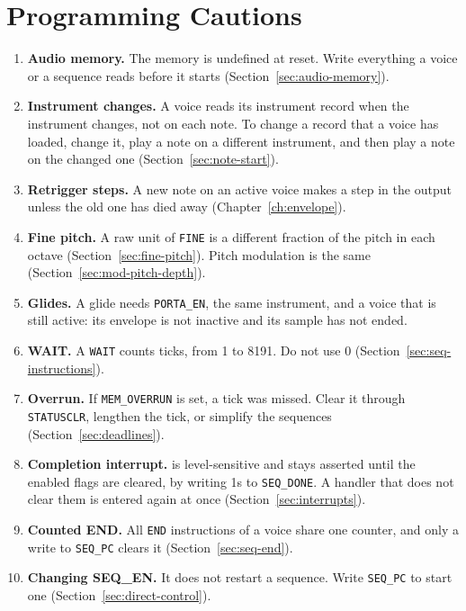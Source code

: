 \section{Programming Cautions}
\label{sec:cautions}

\begin{enumerate}
	\item \textbf{Audio memory.} The memory is undefined at reset. Write everything a voice or a sequence reads before it
	      starts (Section~\ref{sec:audio-memory}).
	\item \textbf{Instrument changes.} A voice reads its instrument record when the instrument changes, not on each note.
	      To change a record that a voice has loaded, change it, play a note on a different instrument, and then play a note on the changed one
	      (Section~\ref{sec:note-start}).
	\item \textbf{Retrigger steps.} A new note on an active voice makes a step in the output unless the old one has died
	      away (Chapter~\ref{ch:envelope}).
	\item \textbf{Fine pitch.} A raw unit of \texttt{FINE} is a different fraction of the pitch in each octave
	      (Section~\ref{sec:fine-pitch}). Pitch modulation is the same (Section~\ref{sec:mod-pitch-depth}).
	\item \textbf{Glides.} A glide needs \texttt{PORTA\_EN}, the same instrument, and a voice that is still active: its envelope is not inactive and its sample has not ended.
	\item \textbf{WAIT.} A \texttt{WAIT} counts ticks, from 1 to 8191. Do not use 0 (Section~\ref{sec:seq-instructions}).
	\item \textbf{Overrun.} If \texttt{MEM\_OVERRUN} is set, a tick was missed. Clear it through
	      \texttt{STATUSCLR}, lengthen the tick, or simplify the sequences (Section~\ref{sec:deadlines}).
	\item \textbf{Completion interrupt.}  is level-sensitive and stays asserted until the enabled flags are
	      cleared, by writing 1s to \texttt{SEQ\_DONE}. A handler that does not clear them is entered again at once
	      (Section~\ref{sec:interrupts}).
	\item \textbf{Counted END.} All \texttt{END} instructions of a voice share one counter, and only a write to
	      \texttt{SEQ\_PC} clears it (Section~\ref{sec:seq-end}).
	\item \textbf{Changing SEQ\_EN.} It does not restart a sequence. Write \texttt{SEQ\_PC} to start one
	      (Section~\ref{sec:direct-control}).

\end{enumerate}
